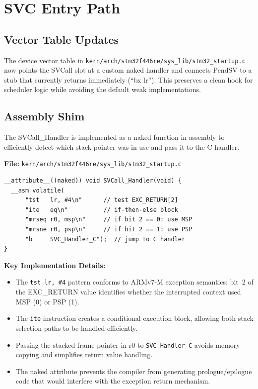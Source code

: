 \documentclass[11pt,a4paper]{article}
\newcommand{\file}[1]{\texttt{#1}}
\begin{document}
\section{SVC Entry Path}

\subsection{Vector Table Updates}
The device vector table in \file{kern/arch/stm32f446re/sys\_lib/stm32\_startup.c} now points the SVCall slot at a custom naked handler and connects PendSV to a stub that currently returns immediately (``bx lr''). This preserves a clean hook for scheduler logic while avoiding the default weak implementations.

\subsection{Assembly Shim}
The SVCall\_Handler is implemented as a naked function in assembly to efficiently detect which stack pointer was in use and pass it to the C handler.

\vspace{0.3cm}
\noindent\textbf{File:} \file{kern/arch/stm32f446re/sys\_lib/stm32\_startup.c}
\begin{verbatim}
__attribute__((naked)) void SVCall_Handler(void) {
  __asm volatile(
      "tst   lr, #4\n"      // test EXC_RETURN[2]
      "ite   eq\n"          // if-then-else block
      "mrseq r0, msp\n"     // if bit 2 == 0: use MSP
      "mrsne r0, psp\n"     // if bit 2 == 1: use PSP
      "b     SVC_Handler_C");  // jump to C handler
}
\end{verbatim}

\textbf{Key Implementation Details:}
\begin{itemize}[leftmargin=1.5em]
  \item The \texttt{tst lr, \#4} pattern conforms to ARMv7-M exception semantics: bit~2 of the EXC\_RETURN value identifies whether the interrupted context used MSP (0) or PSP (1).
  \item The \texttt{ite} instruction creates a conditional execution block, allowing both stack selection paths to be handled efficiently.
  \item Passing the stacked frame pointer in r0 to \texttt{SVC\_Handler\_C} avoids memory copying and simplifies return value handling.
  \item The naked attribute prevents the compiler from generating prologue/epilogue code that would interfere with the exception return mechanism.
\end{itemize}
\end{document}
